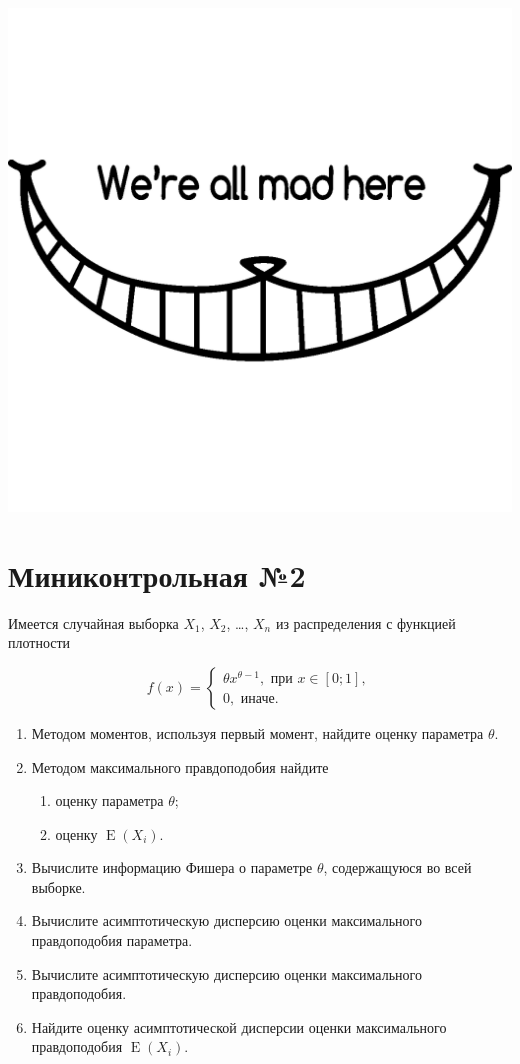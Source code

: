 \documentclass[12pt]{article}
\DeclareMathOperator{\E}{E}
\begin{document}
\begin{center}
  \begin{minipage}{5cm}
    \includegraphics[height=30ex]{cheshire_cat.png}
  \end{minipage}
\end{center}
  
\newpage

\section*{Миниконтрольная №2}

Имеется случайная выборка $X_1$, $X_2$, \ldots, $X_n$ из распределения с функцией плотности

\[  
f(x) = \begin{cases}
\theta x^{\theta - 1}, \text{ при } x\in [0;1], \\
0, \text{ иначе.}
\end{cases}
\]

\begin{enumerate}
  \item Методом моментов, используя первый момент, найдите оценку параметра $\theta$.
  \item Методом максимального правдоподобия найдите
  \begin{enumerate}
    \item оценку параметра $\theta$;
    \item оценку $\E(X_i)$.
  \end{enumerate}
  \item Вычислите информацию Фишера о параметре $\theta$, содержащуюся во всей выборке.
  \item Вычислите асимптотическую дисперсию оценки максимального правдоподобия параметра. 
  \item Вычислите асимптотическую дисперсию оценки максимального правдоподобия.
  \item Найдите оценку асимптотической дисперсии оценки максимального правдоподобия $\E(X_i)$. 
\end{enumerate}
\end{document}
